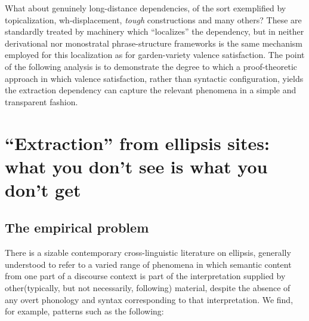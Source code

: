 \documentclass[output=paper,colorlinks,citecolor=brown]{langscibook}
\begin{document}
What about genuinely long-distance dependencies, of the sort
exemplified by topicalization, wh-displacement, \textit{tough}
constructions and many others? These are standardly treated by
machinery which ``localizes'' the dependency, but in neither
derivational nor monostratal phrase-structure frameworks is the same
mechanism employed for this localization as for garden-variety valence
satisfaction. The point of the following analysis is to demonstrate
the degree to which a proof-theoretic approach in which valence satisfaction,
rather than syntactic configuration, yields the extraction dependency
can capture the relevant phenomena in a simple and transparent fashion.

\section{``Extraction'' from ellipsis sites: what you don't see is what you don't get}
\label{sec-extraction}

\subsection{The empirical problem}

There is a sizable contemporary cross-linguistic literature on
ellipsis, generally understood to refer to a varied range of phenomena
in which semantic content from one part of a discourse context is
part of the interpretation supplied by other(typically, but
not necessarily, following)  material, despite the absence of any
overt phonology and syntax corresponding to that interpretation. We
find, for example, patterns such as the following:
\end{document}
